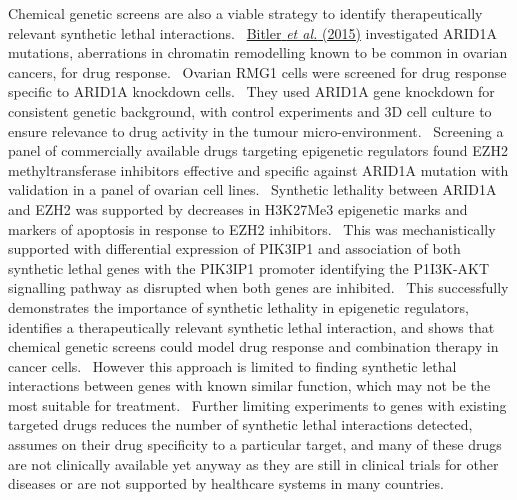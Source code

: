 Chemical genetic screens are also a viable strategy to identify therapeutically relevant synthetic lethal interactions. \ \hyperlink{ENREF13}{Bitler}\hyperlink{ENREF13}{\textit{ et al.}}\hyperlink{ENREF13}{ (2015)} investigated ARID1A mutations, aberrations in chromatin remodelling known to be common in ovarian cancers, for drug response. \ Ovarian RMG1 cells were screened for drug response specific to ARID1A knockdown cells. \ They used ARID1A gene knockdown for consistent genetic background, with control experiments and 3D cell culture to ensure relevance to drug activity in the tumour micro-environment. \ Screening a panel of commercially available drugs targeting epigenetic regulators found EZH2 methyltransferase inhibitors effective and specific against ARID1A mutation with validation in a panel of ovarian cell lines. \ Synthetic lethality between ARID1A and EZH2 was supported by decreases in H3K27Me3 epigenetic marks and markers of apoptosis in response to EZH2 inhibitors. \ This was mechanistically supported with differential expression of PIK3IP1 and association of both synthetic lethal genes with the PIK3IP1 promoter identifying the P1I3K-AKT signalling pathway as disrupted when both genes are inhibited. \ This successfully demonstrates the importance of synthetic lethality in epigenetic regulators, identifies a therapeutically relevant synthetic lethal interaction, and shows that chemical genetic screens could model drug response and combination therapy in cancer cells. \ However this approach is limited to finding synthetic lethal interactions between genes with known similar function, which may not be the most suitable for treatment. \ Further limiting experiments to genes with existing targeted drugs reduces the number of synthetic lethal interactions detected, assumes on their drug specificity to a particular target, and many of these drugs are not clinically available yet anyway as they are still in clinical trials for other diseases or are not supported by healthcare systems in many countries. \  


